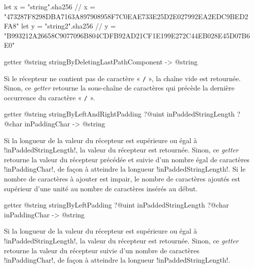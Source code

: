 \begin{galgas4}
  let x = "string".sha256
   // x = "473287F8298DBA7163A897908958F7C0EAE733E25D2E027992EA2EDC9BED2FA8"
  let y = "string2".sha256
   // y = "B993212A26658C9077096B804CDFB92AD21CF1E199E272C44EB028E45D07B6E0"
\end{galgas4}










\begin{galgas3box}
getter @string stringByDeletingLastPathComponent -> @string
\end{galgas3box}

Si le récepteur ne contient pas de caractère « \texttt{/} », la chaîne vide est retournée. Sinon, ce \emph{getter} retourne la sous-chaîne de caractères qui précède la dernière occurrence du caractère « \texttt{/} ».








\begin{galgas3box}
getter @string stringByLeftAndRightPadding
   ?@uint inPaddedStringLength
   ?@char inPaddingChar -> @string
\end{galgas3box}

Si la longueur de la valeur du récepteur est supérieure ou égal à \ggst!inPaddedStringLength!, la valeur du récepteur est retournée. Sinon, ce \emph{getter} retourne la valeur du récepteur précédée et suivie d'un nombre égal de caractères \ggst!inPaddingChar!, de façon à atteindre la longueur \ggst!inPaddedStringLength!. Si le nombre de caractères à ajouter est impair, le nombre de caractères ajoutés est supérieur d'une unité au nombre de caractères insérés au début.









\begin{galgas3box}
getter @string stringByLeftPadding
   ?@uint inPaddedStringLength
   ?@char inPaddingChar -> @string
\end{galgas3box}

Si la longueur de la valeur du récepteur est supérieure ou égal à \ggst!inPaddedStringLength!, la valeur du récepteur est retournée. Sinon, ce \emph{getter} retourne la valeur du récepteur suivie d'un nombre de caractères \ggst!inPaddingChar!, de façon à atteindre la longueur \ggst!inPaddedStringLength!.







